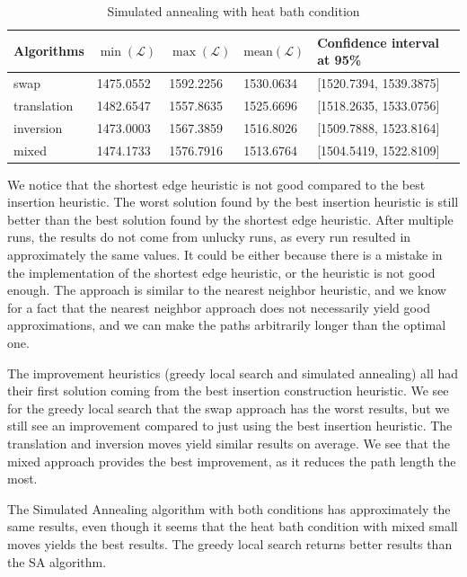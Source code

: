 \documentclass[a4paper, 11pt]{scrartcl}
\begin{document}
\begin{table}[!h]
\centering
\caption{Simulated annealing with heat bath condition}
\label{table:simulated-annealing-heatbath}
\begin{tabular}{@{}lllll@{}}
\toprule
Algorithms  & $\min(\mathcal{L})$ & $\max(\mathcal{L})$ & $\mathrm{mean}(\mathcal{L})$ & Confidence interval at 95\% \\ \midrule
swap        & 1475.0552           & 1592.2256           & 1530.0634                    & [1520.7394, 1539.3875]  \\
translation & 1482.6547           & 1557.8635           & 1525.6696                    & [1518.2635, 1533.0756]   \\
inversion   & 1473.0003           & 1567.3859           & 1516.8026                    & [1509.7888, 1523.8164]  \\
mixed       & 1474.1733           & 1576.7916           & 1513.6764                    & [1504.5419, 1522.8109]  \\ \bottomrule
\end{tabular}
\end{table}

We notice that the shortest edge heuristic is not good compared to the best insertion heuristic. The worst
solution found by the best insertion heuristic is still better than the best solution found by the shortest
edge heuristic. After multiple runs, the results do not come from unlucky runs, as every run resulted in
approximately the same values. It could be either because there is a mistake in the implementation of the
shortest edge heuristic, or the heuristic is not good enough. The approach is similar to the nearest neighbor
heuristic, and we know for a fact that the nearest neighbor approach does not necessarily yield good
approximations, and we can make the paths arbitrarily longer than the optimal one. 

The improvement heuristics (greedy local search and simulated annealing) all had their first solution coming
from the best insertion construction heuristic. We see for the greedy local search that the swap approach has
the worst results, but we still see an improvement compared to just using the best insertion heuristic. The
translation and inversion moves yield similar results on average. We see that the mixed approach provides the
best improvement, as it reduces the path length the most.

The Simulated Annealing algorithm with both conditions has approximately the same results, even though it
seems that the heat bath condition with mixed small moves yields the best results. The greedy local search
returns better results than the SA algorithm.
\end{document}
